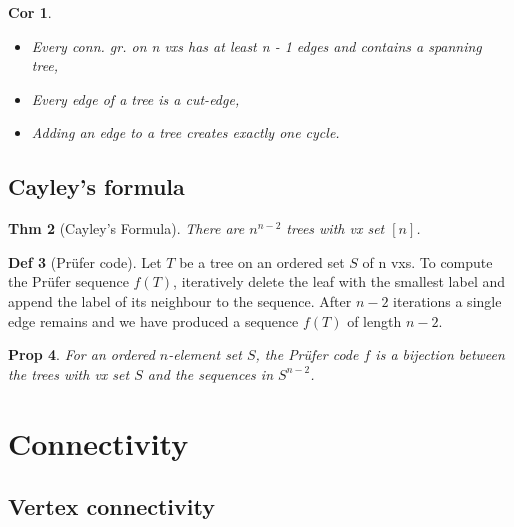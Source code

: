 \documentclass[11pt, fleqn, a4paper, landscape]{article}
\theoremstyle{plain} %
\newtheorem{thm}{Thm}
\newtheorem{pro}[thm]{Prop}
\newtheorem{cor}[thm]{Cor}
\theoremstyle{remark} %
\theoremstyle{definition} %
\newtheorem{defi}[thm]{Def}
\begin{document}
\begin{multicols}{5}
\begin{cor}
\begin{itemize}
\item  Every conn. gr. on n vxs has at least n - 1 edges and contains a spanning tree,
\item Every edge of a tree is a cut-edge,
\item Adding an edge to a tree creates exactly one cycle.
\end{itemize}
\end{cor}

\subsection{Cayley’s formula}
\addtocounter{thm}{1}\addtocounter{thm}{1}
\begin{thm}[Cayley’s Formula]
There are $n^{n-2}$ trees with vx set $[n]$.
\end{thm}

\begin{defi}[Prüfer code]
Let $T$ be a tree on an ordered set $S$ of n vxs. To compute the
Prüfer sequence $f(T)$, iteratively delete the leaf with the smallest label and append the label of its neighbour to the sequence. After $n - 2$ iterations a single edge remains and we have produced a sequence $f(T)$ of length $n - 2$.
\end{defi}
\addtocounter{thm}{1}
\begin{pro}
For an ordered $n$-element set $S$, the Prüfer code $f$ is a bijection between the trees with vx set $S$ and the sequences in $S^{n-2}$.
\end{pro}
\addtocounter{thm}{1}
\addtocounter{thm}{1}

\section{Connectivity}
\subsection{Vertex connectivity}


\end{multicols}
\end{document}
